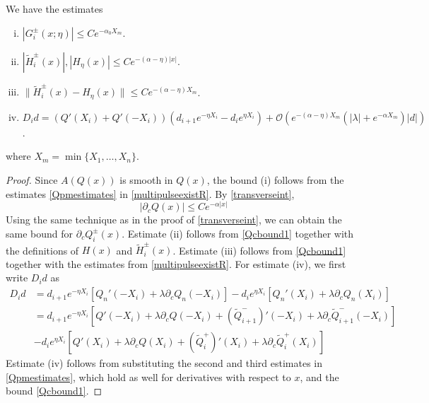 \documentclass[thesis.tex]{subfiles}
\begin{document}
\begin{lemma}\label{lemma:weightedest}
We have the estimates
\begin{enumerate}[(i)]
	\item $|G_i^\pm(x; \eta)| \leq C e^{-\alpha_0 X_m}$.
	\item $|\tilde{H}_i^\pm(x)|, |H_\eta(x)| \leq C e^{-(\alpha - \eta)|x|}$.
	\item $\|\tilde{H}_i^\pm(x) - H_\eta(x) \|  \leq C e^{-(\alpha - \eta) X_m} $.
	\item $D_i d = ( Q'(X_i) + Q'(-X_i) )(d_{i+1} e^{-\eta X_i} - d_i e^{\eta X_i}) + \mathcal{O} \left( e^{-(\alpha - \eta) X_m}\left( |\lambda| +  e^{-\alpha X_m} \right) |d| \right)$.
\end{enumerate}
where $X_m = \min\{X_1, \dots, X_n\}$.
\begin{proof}
Since $A(Q(x))$ is smooth in $Q(x)$, the bound (i) follows from the estimates \cref{Qpmestimates} in \cref{multipulseexistR}. By \cref{transverseint},
\begin{equation}\label{Qcbound1}
|\partial_c Q(x)| \leq C e^{-\alpha|x|}
\end{equation}
Using the same technique as in the proof of \ref{transverseint}, we can obtain the same bound for $\partial_c Q_i^\pm(x)$. Estimate (ii) follows from \cref{Qcbound1} together with the definitions of $H(x)$ and $\tilde{H}_i^\pm(x)$. Estimate (iii) follows from \cref{Qcbound1} together with the estimates from \cref{multipulseexistR}. For estimate (iv), we first write $D_i d$ as
\begin{align*}
D_i d &= d_{i+1} e^{-\eta X_i}[ Q_n'(-X_i) + \lambda \partial_c Q_n(-X_i)] 
- d_i e^{\eta X_i}[ Q_n'(X_i) + \lambda \partial_c Q_n(X_i)]  \\
&= d_{i+1} e^{-\eta X_i} [ Q'(-X_i) + \lambda \partial_c Q(-X_i) + (\tilde{Q}_{i+1}^-)'(-X_i) + \lambda  \partial_c \tilde{Q}_{i+1}^-(-X_i)] \\
&- d_i e^{\eta X_i} [ Q'(X_i) + \lambda \partial_c Q(X_i) + (\tilde{Q}_i^+)'(X_i) + \lambda \partial_c \tilde{Q}_i^+(X_i)] 
\end{align*}
Estimate (iv) follows from substituting the second and third estimates in \cref{Qpmestimates}, which hold as well for derivatives with respect to $x$, and the bound \cref{Qcbound1}.	
\end{proof}
\end{lemma}
\end{document}
